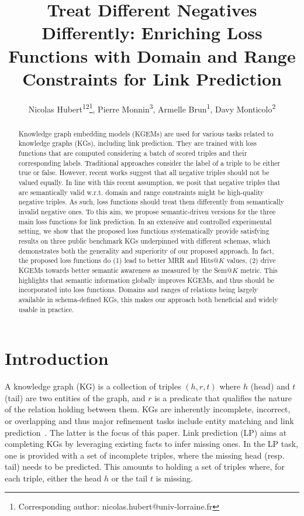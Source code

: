 \documentclass[letterpaper]{article} %
\title{Treat Different Negatives Differently: Enriching Loss Functions with Domain and Range Constraints for Link Prediction}
\author {
    Nicolas Hubert\textsuperscript{\rm 12}\thanks{Corresponding author: nicolas.hubert@univ-lorraine.fr},
    Pierre Monnin\textsuperscript{\rm 3},
    Armelle Brun\textsuperscript{\rm 1},
    Davy Monticolo\textsuperscript{\rm 2}
}
\begin{document}
\maketitle

\begin{abstract}
Knowledge graph embedding models (KGEMs) are used for various tasks related to knowledge graphs (KGs), including link prediction. 
They are trained with loss functions that are computed considering a batch of scored triples and their corresponding labels. 
Traditional approaches consider the label of a triple to be either true or false. However, recent works suggest that all negative triples should not be valued equally. 
In line with this recent assumption, we posit that negative triples that are semantically valid w.r.t. domain and range constraints might be high-quality negative triples. As such, loss functions should treat them differently from semantically invalid negative ones. To this aim, we propose semantic-driven versions for the three main loss functions for link prediction.
In an extensive and controlled experimental setting, we show that the proposed loss functions systematically provide satisfying results on three public benchmark KGs underpinned with different schemas, which demonstrates both the generality and superiority of our proposed approach. 
In fact, the proposed loss functions do (1) lead to better MRR and Hits@$K$ values, (2) drive KGEMs towards better semantic awareness as measured by the Sem@$K$ metric. 
This highlights that semantic information globally improves KGEMs, and thus should be incorporated into loss functions. Domains and ranges of relations being largely available in schema-defined KGs, this makes our approach both beneficial and widely usable in practice.
\end{abstract}

\section{Introduction}\label{introduction}
A knowledge graph (KG) is a collection of triples $(h,r,t)$ where $h$ (head) and $t$ (tail) are two entities of the graph, and $r$ is a predicate that qualifies the nature of the relation holding between them.
KGs are inherently incomplete, incorrect, or overlapping and thus major refinement tasks include entity matching and link prediction~\cite{wang2017}. The latter is the focus of this paper.
Link prediction (LP) aims at completing KGs by leveraging existing facts to infer missing ones.
In the LP task, one is provided with a set of incomplete triples, where the missing head (resp. tail) needs to be predicted. This amounts to holding a set of triples where, for each triple, either the head $h$ or the tail $t$ is missing. 
\end{document}
